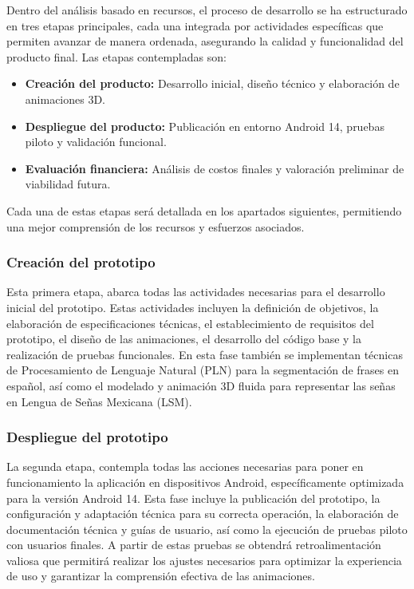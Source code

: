 Dentro del análisis basado en recursos, el proceso de desarrollo se ha estructurado en tres etapas principales, cada una integrada por actividades específicas que permiten avanzar de manera ordenada, asegurando la calidad y funcionalidad del producto final. Las etapas contempladas son:

\begin{itemize}
	\item \textbf{Creación del producto:} Desarrollo inicial, diseño técnico y elaboración de animaciones 3D.
	\item \textbf{Despliegue del producto:} Publicación en entorno Android 14, pruebas piloto y validación funcional.
	\item \textbf{Evaluación financiera:} Análisis de costos finales y valoración preliminar de viabilidad futura.
\end{itemize}

Cada una de estas etapas será detallada en los apartados siguientes, permitiendo una mejor comprensión de los recursos y esfuerzos asociados.

\subsubsection{Creación del prototipo}

Esta primera etapa, abarca todas las actividades necesarias para el desarrollo inicial del prototipo. Estas actividades incluyen la definición de objetivos, la elaboración de especificaciones técnicas, el establecimiento de requisitos del prototipo, el diseño de las animaciones, el desarrollo del código base y la realización de pruebas funcionales. En esta fase también se implementan técnicas de Procesamiento de Lenguaje Natural (PLN) para la segmentación de frases en español, así como el modelado y animación 3D fluida para representar las señas en Lengua de Señas Mexicana (LSM).

\subsubsection{Despliegue del prototipo}

La segunda etapa, contempla todas las acciones necesarias para poner en funcionamiento la aplicación en dispositivos Android, específicamente optimizada para la versión Android 14. Esta fase incluye la publicación del prototipo, la configuración y adaptación técnica para su correcta operación, la elaboración de documentación técnica y guías de usuario, así como la ejecución de pruebas piloto con usuarios finales. A partir de estas pruebas se obtendrá retroalimentación valiosa que permitirá realizar los ajustes necesarios para optimizar la experiencia de uso y garantizar la comprensión efectiva de las animaciones.

